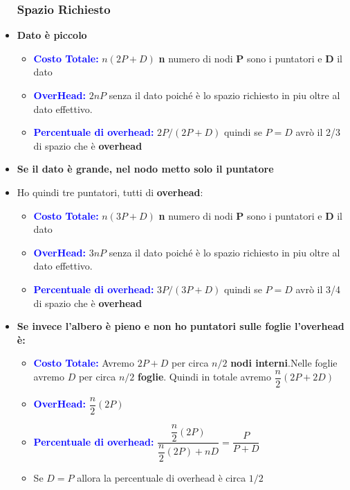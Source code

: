 \begin{itemize}
    \subsubsection{Spazio Richiesto}
    \item \textbf{Dato è piccolo}
    \begin{itemize}
        \item \textbf{\textcolor{blue}{Costo Totale:}} $n(2P + D)$ \newline\textbf{n} numero di nodi \textbf{P} sono i puntatori e \textbf{D} il dato
        \item \textbf{\textcolor{blue}{OverHead:}} $2nP$ senza il dato poiché è lo spazio richiesto in piu oltre al dato effettivo.
        \item \textbf{\textcolor{blue}{Percentuale di overhead:}} $2P/(2P + D)$ quindi se $P = D$ avrò il 2/3 di spazio che è \textbf{overhead}
    \end{itemize}
    \item \textbf{Se il dato è grande, nel nodo metto solo il puntatore}
    \item  Ho quindi tre puntatori, tutti di \textbf{overhead}:
    \begin{itemize}
        \item \textbf{\textcolor{blue}{Costo Totale:}} $n(3P + D)$ \newline\textbf{n} numero di nodi \textbf{P} sono i puntatori e \textbf{D} il dato
        \item \textbf{\textcolor{blue}{OverHead:}} $3nP$ senza il dato poiché è lo spazio richiesto in piu oltre al dato effettivo.
        \item \textbf{\textcolor{blue}{Percentuale di overhead:}} $3P/(3P + D)$ quindi se $P = D$ avrò il 3/4 di spazio che è \textbf{overhead}
    \end{itemize}

    \item \textbf{Se invece l'albero è pieno e non ho puntatori sulle foglie l'overhead è:}
    \begin{itemize}
        \item \textbf{\textcolor{blue}{Costo Totale:}} Avremo $2P + D$ per circa $n/2$ \textbf{nodi interni}.\newline Nelle foglie avremo $D$ per circa $n/2$ \textbf{foglie}. \newline\newline Quindi in totale avremo $\dfrac{n}{2}(2P+2D)$
        \item \textbf{\textcolor{blue}{OverHead:}} $\dfrac{n}{2}(2P)$
        \item \textbf{\textcolor{blue}{Percentuale di overhead:}} \newline\newline $\dfrac{\dfrac{n}{2}(2P)}{\dfrac{n}{2}(2P) + nD} = \dfrac{P}{P+D}$ 
        \item Se $D = P$ allora la percentuale di overhead è circa $1/2$
    \end{itemize}
\end{itemize}
